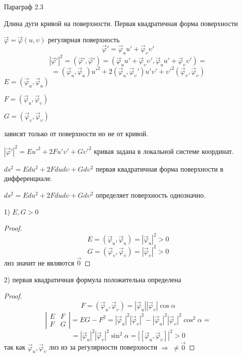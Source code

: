 \begin{title}[\Large]
  Параграф 2.3
\end{title}

\begin{title}[\Large]
  Длина дуги кривой на поверхности. Первая квадратичная форма поверхности
\end{title}

\begin{define}
  $\vec \varphi = \vec \varphi(u, \upsilon)$ регулярная поверхность
  $$
  \vec \varphi' = \vec \varphi_u u' + \vec \varphi_{\upsilon} \upsilon'
  $$
  $$
  |\vec \varphi'|^2 = (\vec \varphi', \vec \varphi') =
  (\vec \varphi_u u' + \vec \varphi_{\upsilon} \upsilon',
  \vec \varphi_u u' + \vec \varphi_{\upsilon} \upsilon') =
  $$
  $$
  = (\vec \varphi_u, \vec \varphi_u)u'^2 + 2(\vec \varphi_u,
  \vec \varphi_{\upsilon}') u' \upsilon' + \upsilon'^2 (\vec \varphi_{\upsilon},
  \vec \varphi_{\upsilon})
  $$
  $E = (\vec \varphi_u, \vec \varphi_u)$

  $F = (\vec \varphi_u, \vec \varphi_{\upsilon})$

  $G = (\vec \varphi_{\upsilon}, \vec \varphi_{\upsilon})$

  зависят только от поверхности но не от кривой.

  $|\vec \varphi'|^2 = E u'^2 + 2Fu'\upsilon' + G\upsilon'^2$ кривая задана в
  локальной системе координат.

  $ds^2 = Edu^2 + 2Fdud\upsilon + Gd\upsilon^2$ первая квадратичная форма
  поверхности в дифференциале.

  $ds^2 = Edu^2 + 2Fdud\upsilon + Gd\upsilon^2$ определяет поверхность
  однозначно.
\end{define}

\begin{block}[Свойства]
  1) $E,G > 0$

  \begin{proof}
    $$
    E = (\vec \varphi_u, \vec \varphi_u) = |\vec \varphi_u|^2 > 0
    $$
    $$
    G = (\vec \varphi_{\upsilon}, \vec \varphi_{\upsilon}) =
    |\vec \varphi_{\upsilon}|^2 > 0
    $$
    лнз значит не являются $\vec 0$
  \end{proof}

  2) первая квадратичная формула положительна определена

  \begin{proof}
    $$
    F = (\vec \varphi_u, \vec \varphi_{\upsilon}) = |\vec \varphi_u|
    |\vec \varphi_{\upsilon}| \cos \alpha
    $$
    $$
    \left|
    \begin{array}{cc}
      E & F \\
      F & G
    \end{array}
    \right|
    = EG - F^2 = |\vec \varphi_u|^2|\vec \varphi_{\upsilon}|^2 -
    |\vec \varphi_u|^2 |\vec \varphi_{\upsilon}|^2 \cos^2 \alpha =
    $$
    $$
    = |\vec \varphi_u|^2
    |\vec \varphi_{\upsilon}|^2 \sin^2 \alpha = |[\vec \varphi_u, \vec
    \varphi_{\upsilon}]|^2 > 0
    $$
    так как $\vec \varphi_u, \vec \varphi_{\upsilon}$ лнз из за регулярности
    поверхности $\Rightarrow ~ \not= \vec 0$
  \end{proof}
\end{block}

